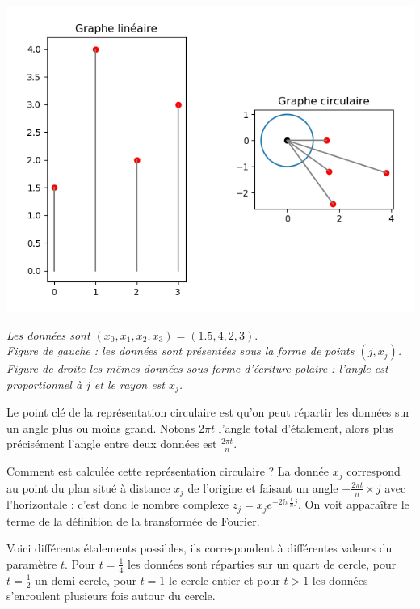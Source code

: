 \documentclass[11pt,class=report,crop=false]{standalone}
\begin{document}
\begin{center}
\includegraphics[scale=\myscale,scale=0.7]{figures/fourier-2}

\nopagebreak

\begin{minipage}{0.8\textwidth}
\center\emph{
Les données sont $(x_0,x_1,x_2,x_3) = (1.5,4,2,3).$\\
Figure de gauche : les données sont présentées sous la forme de points $(j,x_j)$.\\
Figure de droite les mêmes données sous forme d'écriture polaire : l'angle est proportionnel à $j$ et le rayon est $x_j$.}
\end{minipage}

\end{center}

Le point clé de la représentation circulaire est qu'on peut répartir les données sur un angle plus ou moins grand. Notons $2\pi t$ l'angle total d'étalement, alors plus précisément l'angle entre deux données est $\frac{2\pi t}{n}$.

Comment est calculée cette représentation circulaire ? La donnée $x_j$ correspond au point du plan situé à distance $x_j$ de l'origine et faisant un angle $-\frac{2\pi t}{n} \times j$ avec l'horizontale : c'est donc le nombre complexe $z_j = x_j e^{-2 \ii \pi \frac{t}{n} j}$. On voit apparaître le terme de la définition de la transformée de Fourier.


Voici différents étalements possibles, ils correspondent à différentes valeurs du paramètre $t$.
Pour $t=\frac14$ les données sont réparties sur un quart de cercle, pour $t=\frac12$ un demi-cercle, pour $t=1$ le cercle entier et pour $t>1$ les données s'enroulent plusieurs fois autour du cercle.
\end{document}
